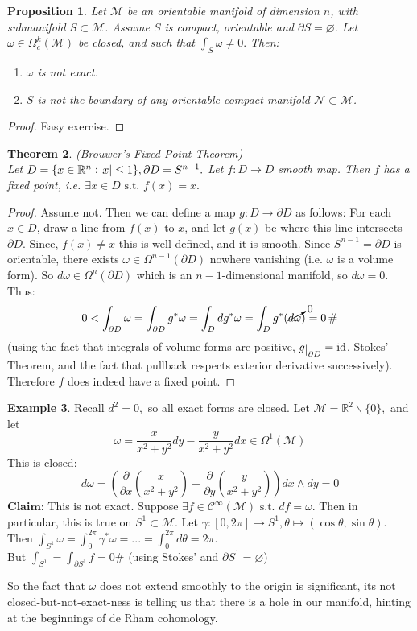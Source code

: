 \documentclass[10pt]{article}
\theoremstyle{plain}
\newtheorem{thm}{Theorem}[section] %
\newtheorem{prop}[thm]{Proposition}
\theoremstyle{definition}
\newtheorem{exmp}[thm]{Example} %
\newcommand{\st}{\text{ s.t. }}
\newcommand{\Claim}{\textbf{Claim: }}
\newcommand{\id}{\text{id}}
\newcommand{\Real}{\mathbb{R}}
\newcommand{\man}{\mathcal{M}}
\newcommand{\nan}{\mathcal{N}}
\newcommand{\pformman}[1]{\Omega^{#1}(\man)}
\newcommand{\compactpformman}[1]{\Omega^{#1}_c(\man)}
\newcommand{\dx}{dx}
\newcommand{\dy}{dy}
\newcommand{\deriv}{d}
\newcommand{\df}{df}
\newcommand{\dw}{d\omega}
\newcommand{\cts}[1]{\mathcal{C}^{\infty}(#1)}
\def\restrict#1{\raise-.5ex\hbox{\ensuremath|}_{#1}}
\newcommand{\mysection}[1]{
    \setcounter{thm}{0}
    \section*{#1}
    \addcontentsline{toc}{section}{#1}
    \addtocounter{section}{1}
    \setcounter{subsection}{0}

}
\begin{document}
\begin{prop}
Let $\man$ be an orientable manifold of dimension $n$, with submanifold $S\subset \man$. Assume $S$ is compact, orientable and $\partial S = \varnothing$. Let $\omega \in \compactpformman{k}$ be closed, and such that $\int_S \omega \neq 0.$ Then:
\begin{enumerate}
    \item $\omega$ is not exact.
    \item $S$ is not the boundary of any orientable compact manifold $\nan \subset \man$.
\end{enumerate}
\end{prop}\noindent
\begin{proof}
Easy exercise.
\end{proof}
\begin{thm}
(Brouwer's Fixed Point Theorem) \\
Let $D = \{x\in\Real^n : \abs{x} \leq 1\},\partial D = S^{n-1}.$ Let $f : D \to D $ smooth map. Then $f$ has a fixed point,  i.e. $\exists x \in D \st f(x) = x.$
\end{thm}
\begin{proof}
Assume not. Then we can define a map $g : D \to \partial D$ as follows: For each $x\in D$, draw a line from $f(x)$ to $x$, and let $g(x)$ be where this line intersects $\partial D$. Since, $f(x) \neq x$ this is well-defined, and it is smooth. Since $S^{n-1} = \partial D$ is orientable, there exists $\omega \in \Omega^{n-1}({\partial D})$ nowhere vanishing (i.e. $\omega$ is a volume form). So $\dw \in \Omega^n (\partial D)$ which is an $n-1$-dimensional manifold, so $\dw = 0.$ Thus:
$$0 < \int_{\partial D} \omega = \int_{\partial D} g^* \omega = \int _D \deriv g^* \omega = \int_D g^*(\cancelto{0}{\dw}) = 0 \,\#$$
(using the fact that integrals of volume forms are positive, $g \restrict{\partial D} = \id$, Stokes' Theorem, and the fact that pullback respects exterior derivative successively). Therefore $f$ does indeed have a fixed point.
\end{proof}
\begin{exmp}
Recall $\deriv ^2 = 0,$ so all exact forms are closed. Let $\man = \Real^2 \backslash \{0\}, $ and let 
$$\omega = \frac{x}{x^2+y^2} \dy - \frac{y}{x^2+y^2} \dx \in \pformman{1}$$
This is closed:
$$\dw = \left(\frac{\partial}{\partial x} \left(\frac{x}{x^2+y^2}\right) + \frac{\partial}{\partial y}\left( \frac{y}{x^2+y^2}\right)\right) \dx \wedge \dy = 0$$
$\Claim$This is not exact. Suppose $\exists f \in \cts{\man} \st \df = \omega. $ Then in particular, this is true on $S^1 \subset \man.$
Let $\gamma : [0,2\pi] \to S^1, \theta \mapsto (\cos\theta,\sin\theta).$ Then $\int_{S^1} \omega = \int_0^{2\pi} \gamma^* \omega = ... = \int_0 ^{2\pi} \deriv \theta = 2\pi.$\\
But $\int_{S^1} = \int_{\partial S^1} f = 0 \#$ (using Stokes' and $\partial S^1 = \varnothing$)
\end{exmp}
So the fact that $\omega$ does not extend smoothly to the origin is significant, its not closed-but-not-exact-ness is telling us that there is a hole in our manifold, hinting at the beginnings of de Rham cohomology.
\end{document}
